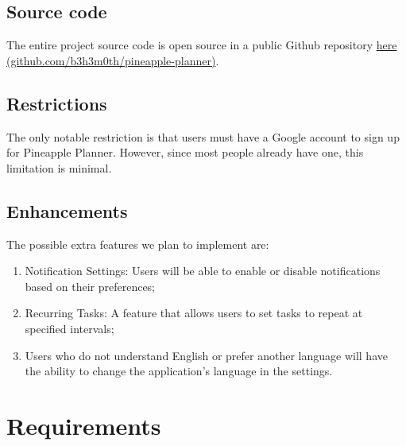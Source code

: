 \documentclass{article}
\begin{document}
\subsection{Source code}
The entire project source code is open source in a public Github repository \href{http://www.github.com/b3h3m0th/pineapple-planner}{here (github.com/b3h3m0th/pineapple-planner)}.

\subsection{Restrictions}
The only notable restriction is that users must have a Google account to sign up for Pineapple Planner. However, since most people already have one, this limitation is minimal.
\subsection{Enhancements}


The possible extra features we plan to implement are:
\begin{enumerate}
  \item Notification Settings: Users will be able to enable or disable notifications based on their preferences;
  \item Recurring Tasks: A feature that allows users to set tasks to repeat at specified intervals;
  \item Users who do not understand English or prefer another language will have the ability to change the application's language in the settings.
\end{enumerate}


\section{Requirements}
\end{document}
